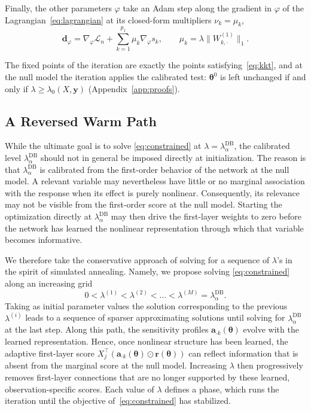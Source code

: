 \documentclass[twoside,11pt]{article}
\newcommand{\lamDB}{\lambda_\alpha^{\mathrm{DB}}}
\newcommand{\bth}{\boldsymbol{\theta}}
\newcommand{\ba}{\mathbf{a}}
\newcommand{\by}{\mathbf{y}}
\newcommand{\PenWonek}{\|W^{(1)}_{k, \cdot}\|_1}
\begin{document}
Finally, the other parameters $\varphi$ take an Adam step along the gradient in $\varphi$ of the Lagrangian~\eqref{eq:lagrangian} at its closed-form multipliers $\nu_k=\mu_k$,
\begin{equation}\label{eq:grad-phi}
    \mathbf d_\varphi=\nabla_\varphi\mathcal{L}_n+\sum_{k=1}^{p_1}\mu_k\nabla_\varphi s_k,
    \qquad \mu_k=\lambda\PenWonek .
\end{equation}

The fixed points of the iteration are exactly the points satisfying~\eqref{eq:kkt}, and at the null model the iteration applies the calibrated test: $\bth^0$ is left unchanged if and only if $\lambda\geq\lambda_0(X,\by)$ (Appendix~\ref{app:proofs}).

\subsection{A Reversed Warm Path}\label{sec:warm}
While the ultimate goal is to solve \eqref{eq:constrained} at $\lambda=\lamDB$, the calibrated level $\lamDB$ should not in general be imposed directly at initialization. The reason is that $\lamDB$ is calibrated from the first-order behavior of the network at the null model. A relevant variable may nevertheless have little or no marginal association with the response when its effect is purely nonlinear.
Consequently, its relevance may not be visible from the first-order score at the null model. Starting the optimization directly at $\lamDB$ may then drive the first-layer weights to zero before the network has learned the nonlinear representation through which that variable becomes informative.

We therefore take the conservative approach of solving for a sequence of $\lambda$'s in the spirit of simulated annealing. Namely, we propose solving \eqref{eq:constrained} along an increasing grid
\begin{equation*}
    0<\lambda^{(1)}<\lambda^{(2)}<\ldots<\lambda^{(M)}=\lamDB.
\end{equation*}
Taking as initial parameter values the solution corresponding to the previous $\lambda^{(i)}$ leads to a sequence of sparser approximating solutions until solving for $\lamDB$ at the last step. Along this path, the sensitivity profiles
$\ba_{\cdot k}(\bth)$ evolve with the learned representation. Hence, once nonlinear structure has been learned, the adaptive first-layer score $X_j^\top \left(\ba_{\cdot k}(\bth)\odot \mathbf r(\bth)\right)$ can reflect information that is absent from the marginal score at the null model. Increasing $\lambda$ then progressively removes first-layer connections that are no longer supported by these learned, observation-specific scores. Each value of $\lambda$ defines a phase, which runs the iteration until the objective of~\eqref{eq:constrained} has stabilized. 
\end{document}
